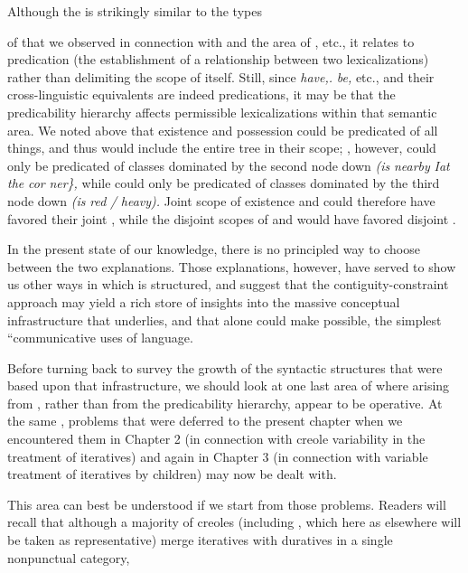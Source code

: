 Although the  is strikingly similar to the types

of  that we observed in connection with  and the area of , etc., it relates to predication (the
establishment of a relationship between two lexicalizations) rather than delimiting the scope of  itself. Still, since \textit{have,.} \textit{be,} etc., and their cross-linguistic equivalents are indeed predications, it may be that the predicability hierarchy affects permissible lexicalizations within that semantic area. We noted above that existence and posses\-sion could be predicated of all things, and thus would include the entire tree in their scope; , however, could only be predicated of classes dominated by the second node down \textit{(is} \textit{nearby} \textit{I}\textit{at} \textit{the} \textit{cor\-} \textit{ner\},} while  could only be predicated of classes dominated by the third node down \textit{(is} \textit{red} \textit{/} \textit{heavy).} Joint scope of existence and  could therefore have favored their joint , while the disjoint scopes of  and  would have favored disjoint .

In the present state of our knowledge, there is no principled way
to choose between the two explanations. Those explanations, however, have served to show us other ways in which  is struc\-tured, and suggest that the contiguity-constraint approach may yield a rich store of insights into the massive conceptual infrastructure that underlies, and that alone could make possible, the simplest ``communi\-cative uses of language.

Before turning back to survey the growth of the syntactic struc\-tures that were based upon that infrastructure, we should look at one last area of  where  arising from , rather than from the predicability hierarchy, appear to be operative. At the same , problems that were deferred to the present chapter when we encountered them in Chapter 2 (in connection with creole variability in the treatment of iteratives) and again in Chapter 3 (in connection with variable treatment of iteratives by children) may now be dealt with.

This area can best be understood if we start from those problems. Readers will recall that although a majority of creoles (including , which here as elsewhere will be taken as representa\-tive) merge iteratives with duratives in a single nonpunctual category,

